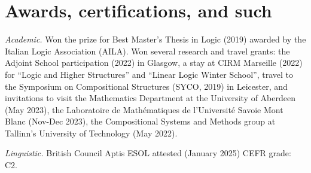 \documentclass[a4paper,11pt]{article}
\begin{document}
%
%
%
%
%

\section*{ Awards, certifications, and such}
\textit{Academic.} Won the prize for Best Master's Thesis in Logic (2019) awarded by the Italian Logic Association (AILA). Won several research and travel grants: the Adjoint School participation (2022) in Glasgow, a stay at CIRM Marseille (2022) for ``Logic and Higher Structures'' and ``Linear Logic Winter School'', travel to the Symposium on Compositional Structures (SYCO, 2019) in Leicester, and invitations to visit the Mathematics Department at the University of Aberdeen (May 2023), the Laboratoire de Mathématiques de l'Université Savoie Mont Blanc (Nov-Dec 2023), the Compositional Systems and Methods group at Tallinn's University of Technology (May 2022).

\textit{Linguistic.} British Council Aptis ESOL attested (January 2025) CEFR grade: C2.
\end{document}
